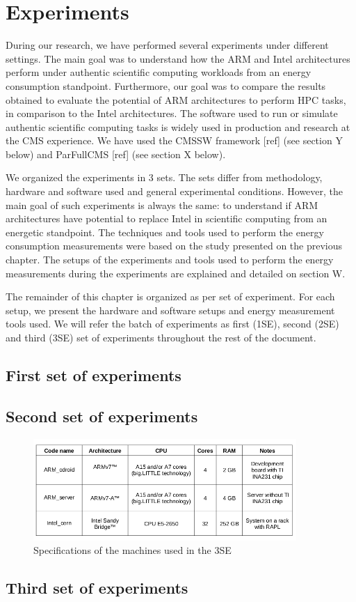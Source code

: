 \chapter{Experiments}


During our research, we have performed several experiments under different
settings. The main goal was to understand how the ARM and Intel architectures
perform under authentic scientific computing workloads from an energy
consumption standpoint. Furthermore, our goal was to compare the results
obtained to evaluate the potential of ARM architectures to perform HPC tasks, in
comparison to the Intel architectures.
The software used to run or simulate authentic scientific computing tasks is
widely used in production and research at the CMS experience. We have used the
CMSSW framework [ref] (see section Y below) and ParFullCMS [ref] (see section X
below).  

We organized the experiments in 3 sets. The sets differ from methodology,
hardware and software used and general experimental conditions. However, the
main goal of such experiments is always the same: to understand if ARM
architectures have potential to replace Intel in scientific computing from an
energetic standpoint. The techniques and tools used to perform the energy
consumption measurements were based on the study presented on the previous
chapter. The setups of the experiments and tools used to perform the energy
measurements during the experiments are explained and detailed on section W.

The remainder of this chapter is organized as per set of experiment. For each
setup, we present the hardware and software setups and energy measurement tools
used. We will refer the batch of experiments as first (1SE), second (2SE) and
third (3SE) set of experiments throughout the rest of the document. 

\section{First set of experiments}
\section{Second set of experiments}

\begin{figure}[h!]
  \centering
    \includegraphics[width=100mm]{"img/machine_specs"}
    \caption{Specifications of the machines used in the 3SE}
    \label{fig:aalto_quad_clamp}
\end{figure}

\section{Third set of experiments}


